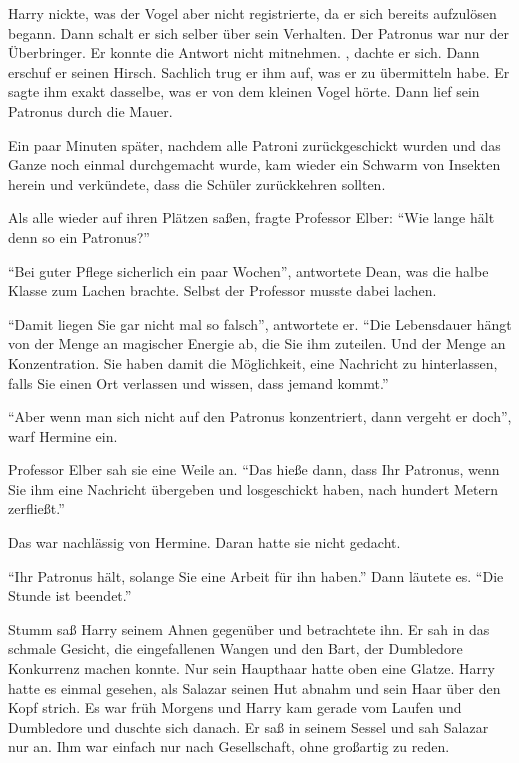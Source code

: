 Harry nickte, was der Vogel aber nicht registrierte, da er sich bereits aufzulösen begann. Dann schalt er sich selber über sein Verhalten. Der Patronus war nur der Überbringer. Er konnte die Antwort nicht mitnehmen. , dachte er sich. Dann erschuf er seinen Hirsch. Sachlich trug er ihm auf, was er zu übermitteln habe. Er sagte ihm exakt dasselbe, was er von dem kleinen Vogel hörte. Dann lief sein Patronus durch die Mauer.

Ein paar Minuten später, nachdem alle Patroni zurückgeschickt wurden und das Ganze noch einmal durchgemacht wurde, kam wieder ein Schwarm von Insekten herein und verkündete, dass die Schüler zurückkehren sollten.

Als alle wieder auf ihren Plätzen saßen, fragte Professor Elber: \enquote{Wie lange hält denn so ein Patronus?}

\enquote{Bei guter Pflege sicherlich ein paar Wochen}, antwortete Dean, was die halbe Klasse zum Lachen brachte. Selbst der Professor musste dabei lachen.

\enquote{Damit liegen Sie gar nicht mal so falsch}, antwortete er. \enquote{Die Lebensdauer hängt von der Menge an magischer Energie ab, die Sie ihm zuteilen. Und der Menge an Konzentration. Sie haben damit die Möglichkeit, eine Nachricht zu hinterlassen, falls Sie einen Ort verlassen und wissen, dass jemand kommt.}

\enquote{Aber wenn man sich nicht auf den Patronus konzentriert, dann vergeht er doch}, warf Hermine ein.

Professor Elber sah sie eine Weile an. \enquote{Das hieße dann, dass Ihr Patronus, wenn Sie ihm eine Nachricht übergeben und losgeschickt haben, nach hundert Metern zerfließt.}

Das war nachlässig von Hermine. Daran hatte sie nicht gedacht.

\enquote{Ihr Patronus hält, solange Sie eine Arbeit für ihn haben.} Dann läutete es. \enquote{Die Stunde ist beendet.}

\trenn

Stumm saß Harry seinem Ahnen gegenüber und betrachtete ihn. Er sah in das schmale Gesicht, die eingefallenen Wangen und den Bart, der Dumbledore Konkurrenz machen konnte. Nur sein Haupthaar hatte oben eine Glatze. Harry hatte es einmal gesehen, als Salazar seinen Hut abnahm und sein Haar über den Kopf strich. Es war früh Morgens und Harry kam gerade vom Laufen und Dumbledore und duschte sich danach. Er saß in seinem Sessel und sah Salazar nur an. Ihm war einfach nur nach Gesellschaft, ohne großartig zu reden.

